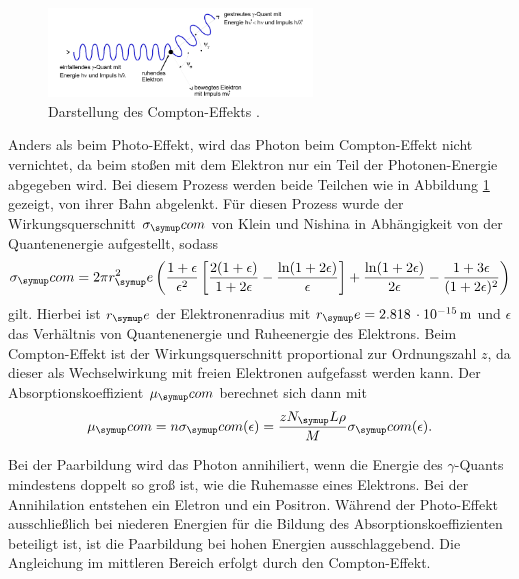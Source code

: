 \begin{figure}
  \includegraphics[width=7cm]{bilder/compton.jpg}
  \caption{Darstellung des Compton-Effekts \cite{704}.}
  \label{fig:com}
\end{figure}
Anders als beim Photo-Effekt, wird das Photon beim Compton-Effekt nicht vernichtet,
da beim stoßen mit dem Elektron nur ein Teil der Photonen-Energie abgegeben wird.
Bei diesem Prozess werden beide Teilchen wie in Abbildung \ref{fig:com} gezeigt,
von ihrer Bahn abgelenkt.
Für diesen Prozess wurde der Wirkungsquerschnitt $\sigma_\su{com}$ von Klein und
Nishina in Abhängigkeit von der Quantenenergie aufgestellt, sodass
\begin{equation}
  \sigma_\su{com}= 2\pi r^2_\su{e}\lf(\frac{1+\epsilon}{\epsilon^2}\lf[\frac{2(1+
  \epsilon)}{1+2\epsilon}-\frac{\ln(1+2\epsilon)}{\epsilon}\rt]+\frac{\ln(1+2\epsilon)}
  {2\epsilon}-\frac{1+3\epsilon}{(1+2\epsilon)^2}\rt)
  \label{eqn:sigma}
\end{equation}
gilt. Hierbei ist $r_\su{e}$ der Elektronenradius mit $r_\su{e}=2.818\,\cdot10^
{-15}\mt$ \cite{rad} und $\epsilon$ das Verhältnis von Quantenenergie und Ruheenergie
des Elektrons.
Beim Compton-Effekt ist der Wirkungsquerschnitt proportional zur Ordnungszahl $z$,
da dieser als Wechselwirkung mit freien Elektronen aufgefasst werden kann.
Der Absorptionskoeffizient $\mu_\su{com}$ berechnet sich dann mit
\begin{equation}
  \mu_\su{com}=n\sigma_\su{com}(\epsilon)=\frac{zN_\su{L}\rho}{M}\sigma_\su{com}
  (\epsilon).
  \label{eqn:mu}
\end{equation}

Bei der Paarbildung wird das Photon annihiliert, wenn die Energie des $\gamma$-Quants
mindestens doppelt so groß ist, wie die Ruhemasse eines Elektrons. Bei der
Annihilation entstehen ein Eletron und ein Positron.
Während der Photo-Effekt ausschließlich bei niederen Energien für die Bildung des
Absorptionskoeffizienten beteiligt ist, ist die Paarbildung bei hohen Energien
ausschlaggebend. Die Angleichung im mittleren Bereich erfolgt durch den
Compton-Effekt.
